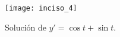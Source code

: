 \begin{figure}[!hbt]
\centering
  \texttt{[image: inciso\_4]}
	\caption{Solución de $y'=\cos{t}+\sin{t}$.}%
	\label{fig:i4}
\end{figure}
